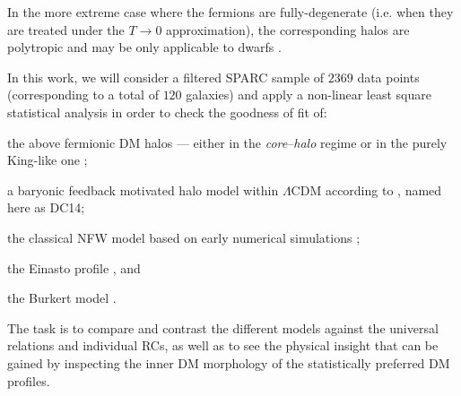 \begin{asparaenum}[(i)]
    \item In the more extreme case where the fermions are fully-degenerate (i.e. when they are treated under the $T \to 0$ approximation), the corresponding halos are polytropic and may be only applicable to dwarfs \citep{2015JCAP...01..002D}.
\end{asparaenum}

In this work, we will consider a filtered SPARC sample of $2369$ data points (corresponding to a total of $120$ galaxies) and apply a non-linear least square statistical analysis in order to check the goodness of fit of: 
\begin{inparaenum}[(a)]
    \item the above fermionic DM halos --- either in the \textit{core}--\textit{halo} regime \citep{2019PDU....24..278A,2021MNRAS.502.4227A} or in the purely King-like one \citep{2021MNRAS.502.4227A};
    \item a baryonic feedback motivated halo model within $\Lambda$CDM according to \citet{2014MNRAS.441.2986D}, named here as DC14;
    \item the classical NFW model based on early numerical simulations \citep{1997ApJ...490..493N};
    \item the Einasto profile \citep{1989A&A...223...89E,2006AJ....132.2685M}, and
    \item the Burkert model \citep{1995ApJ...447L..25B}.
\end{inparaenum} 
%
The task is to compare and contrast the different models against the universal relations and individual RCs, as well as to see the physical insight that can be gained by inspecting the inner DM morphology of the statistically preferred DM profiles.




